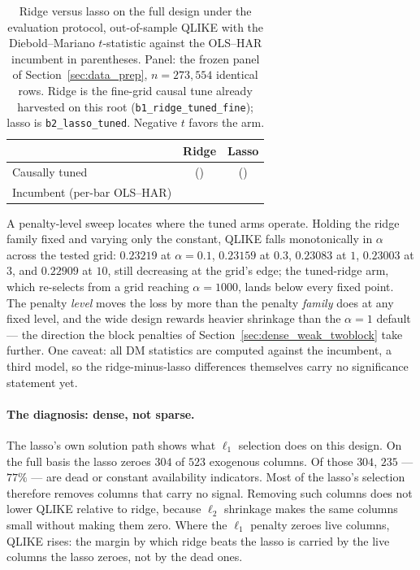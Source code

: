 \begin{table}[H]
\centering
\caption{Ridge versus lasso on the full design under the evaluation
protocol, out-of-sample QLIKE with the Diebold--Mariano $t$-statistic
against the OLS--HAR incumbent in parentheses. Panel: the frozen panel of
Section~\ref{sec:data_prep}, $n = 273{,}554$ identical rows.
Ridge is the fine-grid causal tune already harvested on this root
(\texttt{b1\_ridge\_tuned\_fine}); lasso is \texttt{b2\_lasso\_tuned}.
Negative $t$ favors the arm.}
\label{tab:lasso_vs_ridge}
\begin{tabular}{@{}lcc@{}}
\toprule
 & Ridge & Lasso \\
\midrule
Causally tuned & \unifBOneRidgeTunedFineQLIKE{} (\unifBOneRidgeTunedFineDM{}) & \unifBTwoLassoTunedQLIKE{} (\unifBTwoLassoTunedDM{}) \\
\midrule
Incumbent (per-bar OLS--HAR) & \multicolumn{2}{c}{\unifAzeroQLIKE{}} \\
\bottomrule
\end{tabular}
\end{table}

A penalty-level sweep locates where the tuned arms operate. Holding the
ridge family fixed and varying only the constant, QLIKE falls
monotonically in $\alpha$
across the tested grid: $0.23219$ at $\alpha = 0.1$, $0.23159$ at $0.3$,
$0.23083$ at $1$, $0.23003$ at $3$, and $0.22909$ at $10$, still
decreasing at the grid's edge; the tuned-ridge arm, which re-selects from
a grid reaching $\alpha = 1000$, lands below every fixed point. The
penalty \emph{level} moves the loss by more than the penalty \emph{family}
does at any fixed level, and the wide design rewards heavier shrinkage
than the $\alpha = 1$ default --- the direction the block penalties of
Section~\ref{sec:dense_weak_twoblock} take further. One caveat: all DM
statistics are computed against the incumbent, a third model, so the
ridge-minus-lasso differences themselves carry no significance statement
yet. 

\paragraph{The diagnosis: dense, not sparse.}\label{sec:dense_weak_diagnosis}
The lasso's own solution path shows what $\ell_1$ selection does on this
design. On the full basis the lasso zeroes $304$ of $523$ exogenous columns.
Of those $304$, $235$ --- $77\%$ --- are dead or constant availability
indicators. Most of the lasso's selection therefore removes columns that
carry no signal. Removing such columns does not lower QLIKE relative to
ridge, because $\ell_2$ shrinkage makes the same columns small without
making them zero. Where the $\ell_1$ penalty zeroes live columns, QLIKE
rises: the margin by which ridge beats the lasso is carried by the live
columns the lasso zeroes, not by the dead ones.

